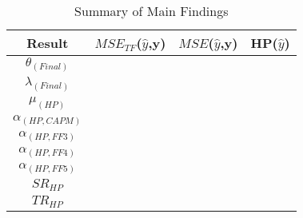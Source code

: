 \begin{table}[H]
    \centering
    \begin{tabular}{||c|c|c|c||}
        \hline
        Result & $MSE_{TF}$($\hat{y}$,y) & $MSE$($\hat{y}$,y) & HP($\hat{y}$)\\ [0.5ex]
        \hline \hline
        $\theta_{(Final)}$ & & & \\
        \hline
        $\lambda_{(Final)}$ & & & \\
        \hline \hline
        $\mu_{(HP)}$ & & & \\
        \hline
        $\alpha_{(HP,CAPM)}$ & & & \\
        \hline
        $\alpha_{(HP,FF3)}$ & & & \\
        \hline
        $\alpha_{(HP,FF4)}$ & & & \\
        \hline
        $\alpha_{(HP,FF5)}$& & &\\
        \hline
        $SR_{HP}$& & &\\ 
        \hline
        $TR_{HP}$ & & & \\ 
        \hline
    \end{tabular}
    \caption{Summary of Main Findings}
    \label{main-findings}
\end{table}